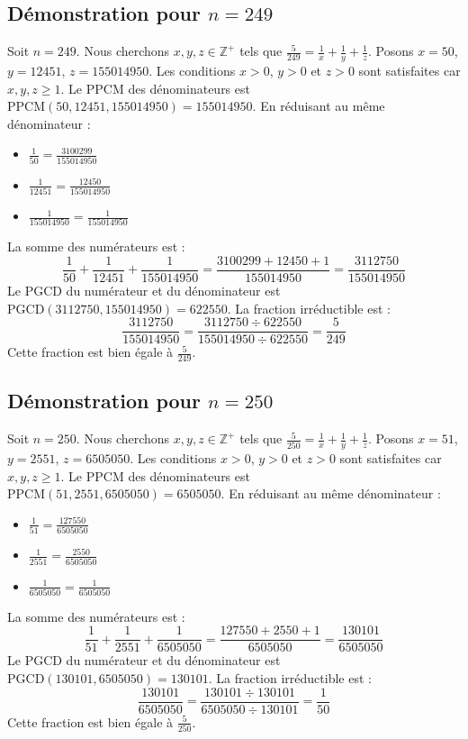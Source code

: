 \documentclass[11pt,a4paper]{article}
\begin{document}
\subsection{Démonstration pour $n = 249$}
Soit $n = 249$. Nous cherchons $x, y, z \in \mathbb{Z}^{+}$ tels que $\frac{5}{249} = \frac{1}{x} + \frac{1}{y} + \frac{1}{z}$.
Posons $x = 50$, $y = 12451$, $z = 155014950$.
Les conditions $x > 0$, $y > 0$ et $z > 0$ sont satisfaites car $x, y, z \geq 1$.
Le PPCM des dénominateurs est $\text{PPCM}(50, 12451, 155014950) = 155014950$.
En réduisant au même dénominateur :
\begin{itemize}
    \item $\frac{1}{50} = \frac{3100299}{155014950}$
    \item $\frac{1}{12451} = \frac{12450}{155014950}$
    \item $\frac{1}{155014950} = \frac{1}{155014950}$
\end{itemize}
La somme des numérateurs est :
$$ \frac{1}{50} + \frac{1}{12451} + \frac{1}{155014950} = \frac{3100299 + 12450 + 1}{155014950} = \frac{3112750}{155014950} $$
Le PGCD du numérateur et du dénominateur est $\text{PGCD}(3112750, 155014950) = 622550$.
La fraction irréductible est :
$$ \frac{3112750}{155014950} = \frac{3112750 \div 622550}{155014950 \div 622550} = \frac{5}{249} $$
Cette fraction est bien égale à $\frac{5}{249}$.

\subsection{Démonstration pour $n = 250$}
Soit $n = 250$. Nous cherchons $x, y, z \in \mathbb{Z}^{+}$ tels que $\frac{5}{250} = \frac{1}{x} + \frac{1}{y} + \frac{1}{z}$.
Posons $x = 51$, $y = 2551$, $z = 6505050$.
Les conditions $x > 0$, $y > 0$ et $z > 0$ sont satisfaites car $x, y, z \geq 1$.
Le PPCM des dénominateurs est $\text{PPCM}(51, 2551, 6505050) = 6505050$.
En réduisant au même dénominateur :
\begin{itemize}
    \item $\frac{1}{51} = \frac{127550}{6505050}$
    \item $\frac{1}{2551} = \frac{2550}{6505050}$
    \item $\frac{1}{6505050} = \frac{1}{6505050}$
\end{itemize}
La somme des numérateurs est :
$$ \frac{1}{51} + \frac{1}{2551} + \frac{1}{6505050} = \frac{127550 + 2550 + 1}{6505050} = \frac{130101}{6505050} $$
Le PGCD du numérateur et du dénominateur est $\text{PGCD}(130101, 6505050) = 130101$.
La fraction irréductible est :
$$ \frac{130101}{6505050} = \frac{130101 \div 130101}{6505050 \div 130101} = \frac{1}{50} $$
Cette fraction est bien égale à $\frac{5}{250}$.
\end{document}
